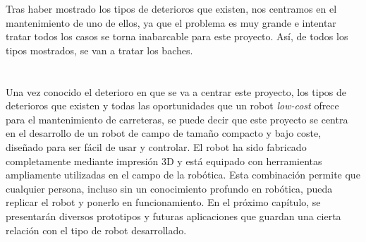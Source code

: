 
Tras haber mostrado los tipos de deterioros que existen, nos centramos en el mantenimiento de uno de ellos, ya que el problema es muy grande e intentar tratar todos los casos se torna inabarcable para este proyecto. Así, de todos los tipos mostrados, se van a tratar los baches.\\\\\\  %

Una vez conocido el deterioro en que se va a centrar este proyecto, los tipos de deterioros que existen y todas las oportunidades que un robot \textit{low-cost} ofrece para el mantenimiento de carreteras, se puede decir que este proyecto se centra en el desarrollo de un robot de campo de tamaño compacto y bajo coste, diseñado para ser fácil de usar y controlar. El robot ha sido fabricado completamente mediante impresión 3D y está equipado con herramientas ampliamente utilizadas en el campo de la robótica. Esta combinación permite que cualquier persona, incluso sin un conocimiento profundo en robótica, pueda replicar el robot y ponerlo en funcionamiento. En el próximo capítulo, se presentarán diversos prototipos y futuras aplicaciones que guardan una cierta relación con el tipo de robot desarrollado.


